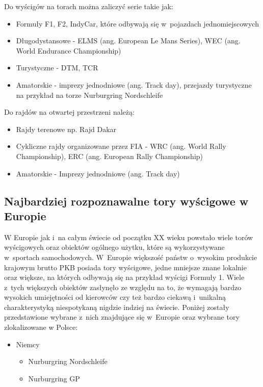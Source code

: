 \documentclass[../Kamil_Kowalewski_Main.tex]{subfiles}
\begin{document}
{{{            \noindent Do wyścigów na torach można zaliczyć serie takie jak:
            \begin{itemize}[noitemsep,topsep=2pt]
                \item Formuły F1, F2, IndyCar, które odbywają się w~pojazdach
                jednomiejscowych
                \item Długodystansowe - ELMS (ang. European Le Mans Series),
                WEC (ang. World Endurance Championship)
                \item Turystyczne - DTM, TCR
                \item Amatorskie - imprezy jednodniowe (ang. Track day), przejazdy
                turystyczne na przykład na torze Nurburgring Nordschleife
            \end{itemize}

            \noindent Do rajdów na otwartej przestrzeni należą:
            \begin{itemize}[noitemsep,topsep=2pt]
                \item Rajdy terenowe np. Rajd Dakar
                \item Cykliczne rajdy organizowane przez FIA - WRC (ang. World Rally Championship),
                ERC (ang. European Rally Championship)
                \item Amatorskie - Imprezy jednodniowe (ang. Track day)
            \end{itemize}
        }

        \subsection{Najbardziej rozpoznawalne tory wyścigowe w Europie}
        \label{chapter2:wprowadzenie_sporty:sporty:tory} {
            W Europie jak i~na całym świecie od początku XX wieku powstało wiele
            torów wyścigowych oraz obiektów ogólnego użytku, które są wykorzystywane
            w~sportach samochodowych. W~Europie większość państw o~wysokim produkcie
            krajowym brutto PKB posiada tory wyścigowe, jedne mniejsze znane lokalnie
            oraz większe, na których odbywają się na przykład wyścigi Formuły 1. Wiele
            z~tych większych obiektów zasłynęło ze względu na to, że wymagają bardzo
            wysokich umiejętności od kierowców czy też bardzo ciekawą i~unikalną
            charakterystyką niespotykaną nigdzie indziej na świecie. Poniżej zostały
            przedstawione wybrane z~nich znajdujące się w~Europie oraz wybrane tory
            zlokalizowane w Polsce:
            \begin{itemize}[noitemsep,topsep=0pt]
                \item Niemcy
                \begin{itemize}[noitemsep,topsep=0pt]
                    \item Nurburgring Nordschleife
                    \item Nurburgring GP
                \end{itemize}


\end{itemize}}}}
\end{document}
